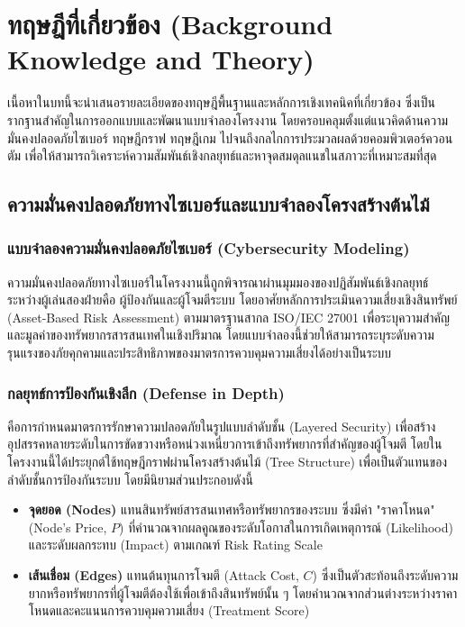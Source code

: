 \chapter{ทฤษฎีที่เกี่ยวข้อง (Background Knowledge and Theory)}
\label{chbackground}

\hspace{1.5em}เนื้อหาในบทนี้จะนำเสนอรายละเอียดของทฤษฎีพื้นฐานและหลักการเชิงเทคนิคที่เกี่ยวข้อง ซึ่งเป็นรากฐานสำคัญในการออกแบบและพัฒนาแบบจำลองโครงงาน โดยครอบคลุมตั้งแต่แนวคิดด้านความมั่นคงปลอดภัยไซเบอร์ ทฤษฎีกราฟ ทฤษฎีเกม ไปจนถึงกลไกการประมวลผลด้วยคอมพิวเตอร์ควอนตัม เพื่อให้สามารถวิเคราะห์ความสัมพันธ์เชิงกลยุทธ์และหาจุดสมดุลแนชในสภาวะที่เหมาะสมที่สุด

\section{ความมั่นคงปลอดภัยทางไซเบอร์และแบบจำลองโครงสร้างต้นไม้}
\label{seccyber_modeling}

\subsection{แบบจำลองความมั่นคงปลอดภัยไซเบอร์ (Cybersecurity Modeling)}
ความมั่นคงปลอดภัยทางไซเบอร์ในโครงงานนี้ถูกพิจารณาผ่านมุมมองของปฏิสัมพันธ์เชิงกลยุทธ์ระหว่างผู้เล่นสองฝ่ายคือ ผู้ป้องกันและผู้โจมตีระบบ โดยอาศัยหลักการประเมินความเสี่ยงเชิงสินทรัพย์ (Asset-Based Risk Assessment) ตามมาตรฐานสากล ISO/IEC 27001 \cite{iso27001} เพื่อระบุความสำคัญและมูลค่าของทรัพยากรสารสนเทศในเชิงปริมาณ โดยแบบจำลองนี้ช่วยให้สามารถระบุระดับความรุนแรงของภัยคุกคามและประสิทธิภาพของมาตรการควบคุมความเสี่ยงได้อย่างเป็นระบบ

\subsection{กลยุทธ์การป้องกันเชิงลึก (Defense in Depth)}
คือการกำหนดมาตรการรักษาความปลอดภัยในรูปแบบลำดับชั้น (Layered Security) เพื่อสร้างอุปสรรคหลายระดับในการขัดขวางหรือหน่วงเหนี่ยวการเข้าถึงทรัพยากรที่สำคัญของผู้โจมตี \cite{layersec} โดยในโครงงานนี้ได้ประยุกต์ใช้ทฤษฎีกราฟผ่านโครงสร้างต้นไม้ (Tree Structure) เพื่อเป็นตัวแทนของลำดับชั้นการป้องกันระบบ โดยมีนิยามส่วนประกอบดังนี้

\begin{itemize}
    \item \textbf{จุดยอด (Nodes)} แทนสินทรัพย์สารสนเทศหรือทรัพยากรของระบบ ซึ่งมีค่า "ราคาโหนด" (Node's Price, $P$) ที่คำนวณจากผลคูณของระดับโอกาสในการเกิดเหตุการณ์ (Likelihood) และระดับผลกระทบ (Impact) ตามเกณฑ์ Risk Rating Scale
    \item \textbf{เส้นเชื่อม (Edges)} แทนต้นทุนการโจมตี (Attack Cost, $C$) ซึ่งเป็นตัวสะท้อนถึงระดับความยากหรือทรัพยากรที่ผู้โจมตีต้องใช้เพื่อเข้าถึงสินทรัพย์นั้น ๆ โดยคำนวณจากส่วนต่างระหว่างราคาโหนดและคะแนนการควบคุมความเสี่ยง (Treatment Score)
\end{itemize}


